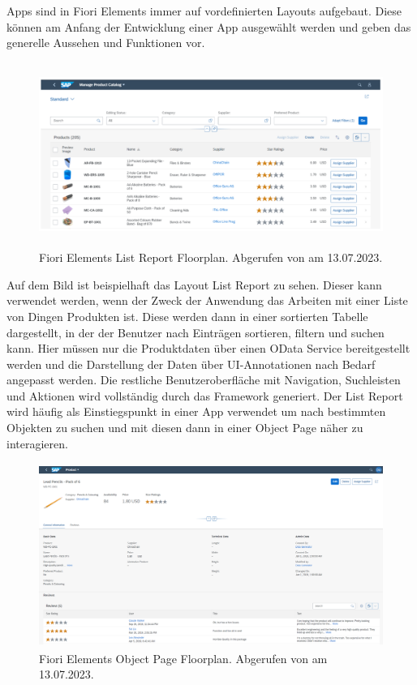 Apps sind in Fiori Elements immer auf vordefinierten Layouts aufgebaut. Diese können am Anfang der Entwicklung einer App ausgewählt werden und geben das generelle Aussehen und Funktionen vor.

\begin{figure}[H]
    \centering
    \includegraphics[height=6cm]{Bilder/Fiori_Elements_List_Floorplan.png}
    \caption[Fiori Elements List Report Floorplan]{Fiori Elements List Report Floorplan. Abgerufen von \cite{sap_ui5-docu_2022} am 13.07.2023.}
    \label{fig:iso_norm}
\end{figure}

Auf dem Bild ist beispielhaft das Layout List Report zu sehen. Dieser kann verwendet werden, wenn der Zweck der Anwendung das Arbeiten mit einer Liste von Dingen \zB Produkten ist. Diese werden dann in einer sortierten Tabelle dargestellt, in der der Benutzer nach Einträgen sortieren, filtern und suchen kann. Hier müssen nur die Produktdaten über einen OData Service bereitgestellt werden und die Darstellung der Daten über UI-Annotationen nach Bedarf angepasst werden. Die restliche Benutzeroberfläche mit Navigation, Suchleisten und Aktionen wird vollständig durch das Framework generiert. Der List Report wird häufig als Einstiegspunkt in einer App verwendet um nach bestimmten Objekten zu suchen und mit diesen dann in einer Object Page näher zu interagieren.

\begin{figure}[H]
    \centering
    \includegraphics[height=6cm]{Bilder/Fiori_Elements_Object_Floorplan.png}
    \caption[Fiori Elements Object Page Floorplan]{Fiori Elements Object Page Floorplan. Abgerufen von \cite{sap_ui5-docu_2022} am 13.07.2023.}
    \label{fig:iso_norm}
\end{figure}

